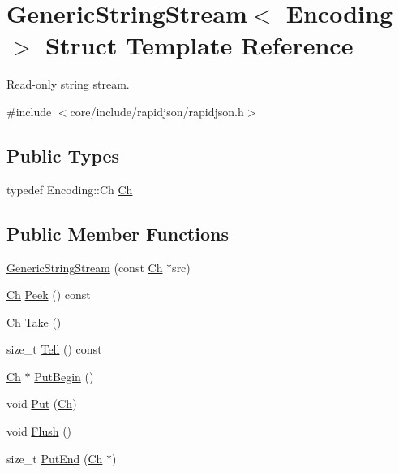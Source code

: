 \hypertarget{structGenericStringStream}{}\section{Generic\+String\+Stream$<$ Encoding $>$ Struct Template Reference}
\label{structGenericStringStream}


Read-\/only string stream.  




{\ttfamily \#include $<$core/include/rapidjson/rapidjson.\+h$>$}

\subsection*{Public Types}
\begin{DoxyCompactItemize}
\item 
typedef Encoding\+::\+Ch \hyperlink{structGenericStringStream_a4289aca895330084ff3168e37e4f08bd}{Ch}
\end{DoxyCompactItemize}
\subsection*{Public Member Functions}
\begin{DoxyCompactItemize}
\item 
\hyperlink{structGenericStringStream_a6b20885ed64e33f5d081a1e83b07da06}{Generic\+String\+Stream} (const \hyperlink{structGenericStringStream_a4289aca895330084ff3168e37e4f08bd}{Ch} $\ast$src)
\item 
\hyperlink{structGenericStringStream_a4289aca895330084ff3168e37e4f08bd}{Ch} \hyperlink{structGenericStringStream_a87d794a70cf132f32521fb2b145ba58d}{Peek} () const 
\item 
\hyperlink{structGenericStringStream_a4289aca895330084ff3168e37e4f08bd}{Ch} \hyperlink{structGenericStringStream_a0d26e3e77e4fca64a87c2d71f48ac5e5}{Take} ()
\item 
size\+\_\+t \hyperlink{structGenericStringStream_a71dde3ded678912be1ef56376a72a653}{Tell} () const 
\item 
\hyperlink{structGenericStringStream_a4289aca895330084ff3168e37e4f08bd}{Ch} $\ast$ \hyperlink{structGenericStringStream_a88c908b4dac9773240ce4bca4b6dd837}{Put\+Begin} ()
\item 
void \hyperlink{structGenericStringStream_aaa59dc5313151a4125bf7840f87a33eb}{Put} (\hyperlink{structGenericStringStream_a4289aca895330084ff3168e37e4f08bd}{Ch})
\item 
void \hyperlink{structGenericStringStream_a5ff1a870d9334cd054cf4ca34c86ddc3}{Flush} ()
\item 
size\+\_\+t \hyperlink{structGenericStringStream_a07b942bacda494afb3b2f7629cef14af}{Put\+End} (\hyperlink{structGenericStringStream_a4289aca895330084ff3168e37e4f08bd}{Ch} $\ast$)
\end{DoxyCompactItemize}
